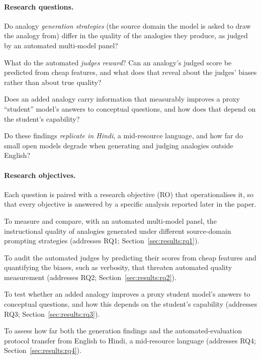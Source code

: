 \documentclass[11pt]{article}
\begin{document}
\paragraph{Research questions.}
\begin{description}[leftmargin=2.2em,style=nextline]
  \item[RQ1.] Do analogy \emph{generation strategies} (the source domain the
    model is asked to draw the analogy from) differ in the quality of the
    analogies they produce, as judged by an automated multi-model panel?
  \item[RQ2.] What do the automated \emph{judges reward}? Can an analogy's judged
    score be predicted from cheap features, and what does that reveal about the
    judges' biases rather than about true quality?
  \item[RQ3.] Does an added analogy carry information that measurably improves a
    proxy ``student'' model's answers to conceptual questions, and how does that
    depend on the student's capability?
  \item[RQ4.] Do these findings \emph{replicate in Hindi}, a mid-resource
    language, and how far do small open models degrade when generating and
    judging analogies outside English?
\end{description}

\paragraph{Research objectives.} Each question is paired with a research objective (RO) that
operationalises it, so that every objective is answered by a specific analysis reported later in
the paper.
\begin{description}[leftmargin=2.2em,style=nextline]
  \item[RO1.] To measure and compare, with an automated multi-model panel, the instructional
    quality of analogies generated under different source-domain prompting strategies
    (addresses RQ1; Section~\ref{sec:results:rq1}).
  \item[RO2.] To audit the automated judges by predicting their scores from cheap features and
    quantifying the biases, such as verbosity, that threaten automated quality measurement
    (addresses RQ2; Section~\ref{sec:results:rq2}).
  \item[RO3.] To test whether an added analogy improves a proxy student model's answers to
    conceptual questions, and how this depends on the student's capability
    (addresses RQ3; Section~\ref{sec:results:rq3}).
  \item[RO4.] To assess how far both the generation findings and the automated-evaluation protocol
    transfer from English to Hindi, a mid-resource language
    (addresses RQ4; Section~\ref{sec:results:rq4}).
\end{description}
\end{document}
